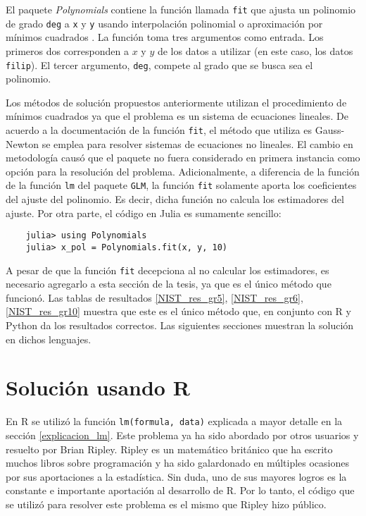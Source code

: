 El paquete \textit{Polynomials} contiene la función llamada \texttt{fit} que ajusta un polinomio de grado \texttt{deg} a \texttt{x} y \texttt{y} usando interpolación polinomial o aproximación por mínimos cuadrados \cite{poly_manual}. La función toma tres argumentos como entrada. Los primeros dos corresponden a $x$ y $y$ de los datos a utilizar (en este caso, los datos \texttt{filip}). El tercer argumento, \texttt{deg},  compete al grado que se busca sea el polinomio. 

Los métodos de solución propuestos anteriormente utilizan el procedimiento de mínimos cuadrados ya que el problema es un sistema de ecuaciones lineales. De acuerdo a la documentación de la función \texttt{fit}, el método que utiliza es Gauss-Newton se emplea para resolver sistemas de ecuaciones no lineales. El cambio en metodología causó que el paquete no fuera considerado en primera instancia como opción para la resolución del problema. Adicionalmente, a diferencia de la función de la función \texttt{lm} del paquete \texttt{GLM}, la función \texttt{fit} solamente aporta los coeficientes del ajuste del polinomio. Es decir, dicha función no calcula los estimadores del ajuste. Por otra parte, el código en \textsf{Julia} es sumamente sencillo: 

\begin{verbatim}
	julia> using Polynomials 
	julia> x_pol = Polynomials.fit(x, y, 10)
\end{verbatim}

A pesar de que la función \texttt{fit} decepciona al no calcular los estimadores, es necesario agregarlo a esta  sección de la tesis, ya que es el único método que funcionó. Las tablas de resultados \ref{NIST_res_gr5}, \ref{NIST_res_gr6}, \ref{NIST_res_gr10} muestra que este es el único método que, en conjunto con \textsf{R} y \textsf{Python} da los resultados correctos. Las siguientes secciones muestran la solución en dichos lenguajes. 

\section{Solución usando R}

En \textsf{R} se utilizó la función \texttt{lm(formula, data)} explicada a mayor detalle en la sección \ref{explicacion_lm}. Este problema ya ha sido abordado por otros usuarios y resuelto por Brian Ripley. Ripley es un matemático británico que ha escrito muchos libros sobre programación y ha sido galardonado en múltiples ocasiones por sus aportaciones a la estadística. Sin duda, uno de sus mayores logros es la constante e importante aportación al desarrollo de \textsf{R}. Por lo tanto, el código que se utilizó para resolver este problema es el mismo que Ripley hizo público.

